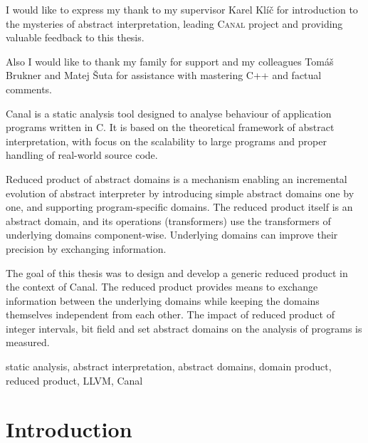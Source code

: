 \documentclass[12pt,oneside]{fithesis2}
\theoremstyle{definition}
\begin{document}
\FrontMatter
\ThesisTitlePage

\begin{ThesisDeclaration}
\DeclarationText
\AdvisorName
\end{ThesisDeclaration}

\begin{ThesisThanks}
I would like to express my thank to my supervisor Karel Klíč for introduction to the mysteries of abstract interpretation, leading \textsc{Canal} project and providing valuable feedback to this thesis.

Also I would like to thank my family for support and my colleagues Tomáš Brukner and Matej Šuta for assistance with mastering C++ and factual comments.
\end{ThesisThanks}

\begin{ThesisAbstract}
Canal is a static analysis tool designed to analyse behaviour of application programs written in C. It is based on the theoretical framework of abstract interpretation, with focus on the scalability to large programs and proper handling of real-world source code.

Reduced product of abstract domains is a mechanism enabling an incremental evolution of abstract interpreter by introducing simple abstract domains one by one, and supporting program-specific domains. The reduced product itself is an abstract domain, and its operations (transformers) use the transformers of underlying domains component-wise. Underlying domains can improve their precision by exchanging information.

The goal of this thesis was to design and develop a generic reduced product in the context of Canal. The reduced product provides means to exchange information between the underlying domains while keeping the domains themselves independent from each other. The impact of reduced product of integer intervals, bit field and set abstract domains on the analysis of programs is measured.
\end{ThesisAbstract}

\begin{ThesisKeyWords}
static analysis, abstract interpretation, abstract domains, domain product, reduced product, LLVM, Canal
\end{ThesisKeyWords}

\tableofcontents

\MainMatter
\chapter{Introduction}
\end{document}
